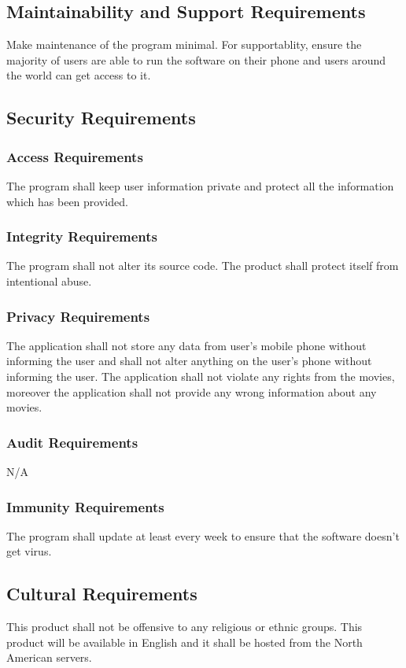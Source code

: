 \documentclass[12pt, titlepage]{article}
\begin{document}
\subsection{Maintainability and Support Requirements}

Make maintenance of the program minimal. For supportablity, ensure the majority of users are able to run the software on their phone and users around the world can get access to it.

\subsection{Security Requirements}
\subsubsection{Access Requirements}
The program shall keep user information private and protect all the information which has been provided.

\subsubsection{Integrity Requirements}
The program shall not alter its source code.
The product shall protect itself from intentional abuse.

\subsubsection{Privacy Requirements}
The application shall not store any data from user’s mobile phone without informing the user and shall not alter anything on the user’s phone without informing the user. The application shall not violate any rights from the movies, moreover the application shall not provide any wrong information about any movies.

\subsubsection{Audit Requirements}
N/A

\subsubsection{Immunity Requirements}
The program shall update at least every week to ensure that the software doesn’t get virus.


\subsection{Cultural Requirements}
This product shall not be offensive to any religious or ethnic groups. This product will be available in English and it shall be hosted from the North American servers.
\end{document}
